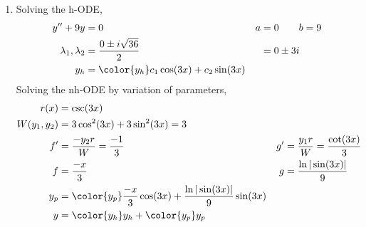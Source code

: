 \begin{enumerate}
    \item Solving the h-ODE,
          \begin{align}
              y'' + 9y                 & = 0                                           & a & = 0 \qquad b = 9 \\
              \lambda_{1}, \lambda_{2} & = \frac{0 \pm i\sqrt{36}}{2}                  &   & = 0 \pm 3i       \\
              y_{h}                    & = {\color{y_h} c_{1}\cos(3x) + c_{2}\sin(3x)}
          \end{align}
          Solving the nh-ODE by variation of parameters,
          \begin{align}
              r(x)            & = \csc(3x)                                                                                                             \\
              W(y_{1}, y_{2}) & = 3\cos^{2}(3x) + 3\sin^{2}(3x) = 3                                                                                    \\
              f'              & = \frac{-y_{2}r}{W} = \frac{-1}{3}                                      & g' & = \frac{y_{1}r}{W} = \frac{\cot(3x)}{3} \\
              f               & = \frac{-x}{3}                                                          & g  & = \frac{\ln|\sin(3x)|}{9}               \\
              y_{p}           & = {\color{y_p} \frac{-x}{3} \cos(3x) + \frac{\ln|\sin(3x)|}{9}\sin(3x)}                                                \\
              y               & = {\color{y_h} y_{h}} + {\color{y_p} y_{p}}
          \end{align}


\end{enumerate}
